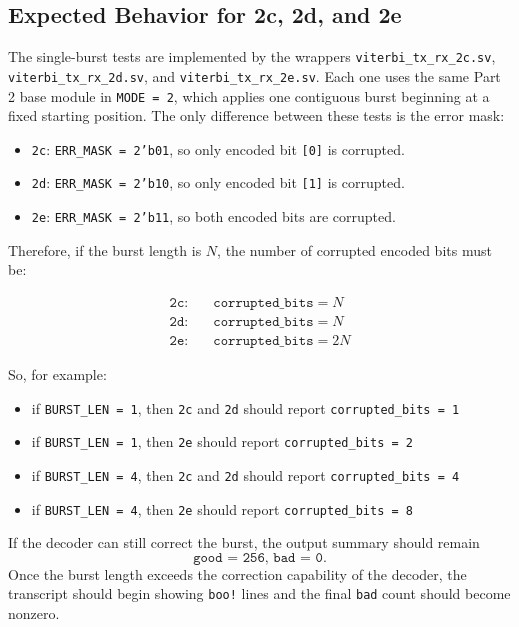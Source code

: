 \documentclass{article}
\begin{document}
\subsection{Expected Behavior for 2c, 2d, and 2e}

The single-burst tests are implemented by the wrappers \texttt{viterbi\_tx\_rx\_2c.sv}, \texttt{viterbi\_tx\_rx\_2d.sv}, and \texttt{viterbi\_tx\_rx\_2e.sv}. Each one uses the same Part 2 base module in \texttt{MODE = 2}, which applies one contiguous burst beginning at a fixed starting position. The only difference between these tests is the error mask:

\begin{itemize}
\item \texttt{2c}: \texttt{ERR\_MASK = 2'b01}, so only encoded bit \texttt{[0]} is corrupted.
\item \texttt{2d}: \texttt{ERR\_MASK = 2'b10}, so only encoded bit \texttt{[1]} is corrupted.
\item \texttt{2e}: \texttt{ERR\_MASK = 2'b11}, so both encoded bits are corrupted.
\end{itemize}

Therefore, if the burst length is \(N\), the number of corrupted encoded bits must be:

\[
\begin{aligned}
\texttt{2c:} & \quad \texttt{corrupted\_bits} = N \\
\texttt{2d:} & \quad \texttt{corrupted\_bits} = N \\
\texttt{2e:} & \quad \texttt{corrupted\_bits} = 2N
\end{aligned}
\]

So, for example:

\begin{itemize}
\item if \texttt{BURST\_LEN = 1}, then \texttt{2c} and \texttt{2d} should report \texttt{corrupted\_bits = 1}
\item if \texttt{BURST\_LEN = 1}, then \texttt{2e} should report \texttt{corrupted\_bits = 2}
\item if \texttt{BURST\_LEN = 4}, then \texttt{2c} and \texttt{2d} should report \texttt{corrupted\_bits = 4}
\item if \texttt{BURST\_LEN = 4}, then \texttt{2e} should report \texttt{corrupted\_bits = 8}
\end{itemize}

If the decoder can still correct the burst, the output summary should remain
\[
\texttt{good = 256,\ bad = 0.}
\]
Once the burst length exceeds the correction capability of the decoder, the transcript should begin showing \texttt{boo!} lines and the final \texttt{bad} count should become nonzero.
\end{document}
